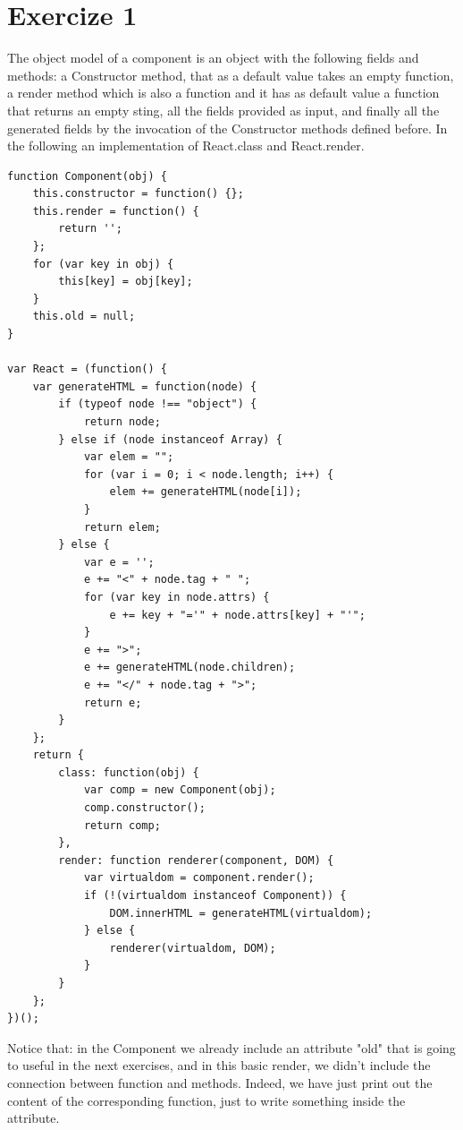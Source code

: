 \documentclass[10pt]{article}
\begin{document}
\section*{Exercize 1}
The object model of a component is an object with the following fields and methods: a Constructor method, that as a default value takes an empty function, a render method which is also a function and it has as default value a function that returns an empty sting, all the fields provided as input, and finally all the generated fields by the invocation of the Constructor methods defined before. In the following an implementation of React.class and React.render. 
\begin{lstlisting}[caption=Simplest definition of react component and a basic render method]
function Component(obj) {
    this.constructor = function() {};
    this.render = function() {
        return '';
    };
    for (var key in obj) {
        this[key] = obj[key];
    }
    this.old = null;
}

var React = (function() {
    var generateHTML = function(node) {
        if (typeof node !== "object") {
            return node;
        } else if (node instanceof Array) {
            var elem = "";
            for (var i = 0; i < node.length; i++) {
                elem += generateHTML(node[i]);
            }
            return elem;
        } else {
            var e = '';
            e += "<" + node.tag + " ";
            for (var key in node.attrs) {
                e += key + "='" + node.attrs[key] + "'";
            }
            e += ">";
            e += generateHTML(node.children);
            e += "</" + node.tag + ">";
            return e;
        }
    };
    return {
        class: function(obj) {
            var comp = new Component(obj);
            comp.constructor();
            return comp;
        },
        render: function renderer(component, DOM) {
            var virtualdom = component.render();
            if (!(virtualdom instanceof Component)) {
                DOM.innerHTML = generateHTML(virtualdom);
            } else {
                renderer(virtualdom, DOM);
            }
        }
    };
})();
\end{lstlisting}
Notice that: in the Component we already include an attribute "old" that is going to useful in the next exercises, and in this basic render, we didn't include the connection between function and methods. Indeed, we have just print out the content of the corresponding function, just to write something inside the attribute.
\end{document}
